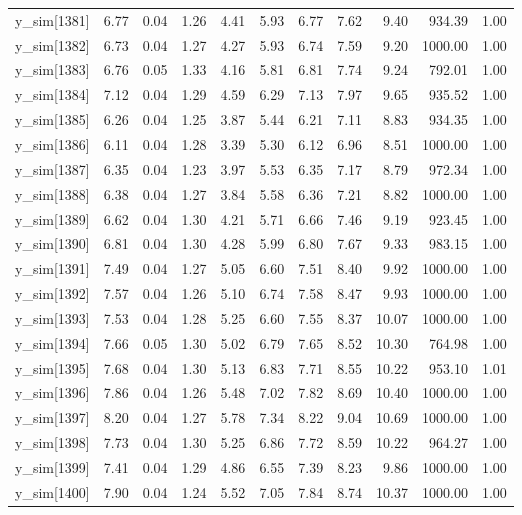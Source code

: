 \begin{table}[ht]
\begin{tabular}{rrrrrrrrrrr}
  y\_sim[1381] & 6.77 & 0.04 & 1.26 & 4.41 & 5.93 & 6.77 & 7.62 & 9.40 & 934.39 & 1.00 \\ 
  y\_sim[1382] & 6.73 & 0.04 & 1.27 & 4.27 & 5.93 & 6.74 & 7.59 & 9.20 & 1000.00 & 1.00 \\ 
  y\_sim[1383] & 6.76 & 0.05 & 1.33 & 4.16 & 5.81 & 6.81 & 7.74 & 9.24 & 792.01 & 1.00 \\ 
  y\_sim[1384] & 7.12 & 0.04 & 1.29 & 4.59 & 6.29 & 7.13 & 7.97 & 9.65 & 935.52 & 1.00 \\ 
  y\_sim[1385] & 6.26 & 0.04 & 1.25 & 3.87 & 5.44 & 6.21 & 7.11 & 8.83 & 934.35 & 1.00 \\ 
  y\_sim[1386] & 6.11 & 0.04 & 1.28 & 3.39 & 5.30 & 6.12 & 6.96 & 8.51 & 1000.00 & 1.00 \\ 
  y\_sim[1387] & 6.35 & 0.04 & 1.23 & 3.97 & 5.53 & 6.35 & 7.17 & 8.79 & 972.34 & 1.00 \\ 
  y\_sim[1388] & 6.38 & 0.04 & 1.27 & 3.84 & 5.58 & 6.36 & 7.21 & 8.82 & 1000.00 & 1.00 \\ 
  y\_sim[1389] & 6.62 & 0.04 & 1.30 & 4.21 & 5.71 & 6.66 & 7.46 & 9.19 & 923.45 & 1.00 \\ 
  y\_sim[1390] & 6.81 & 0.04 & 1.30 & 4.28 & 5.99 & 6.80 & 7.67 & 9.33 & 983.15 & 1.00 \\ 
  y\_sim[1391] & 7.49 & 0.04 & 1.27 & 5.05 & 6.60 & 7.51 & 8.40 & 9.92 & 1000.00 & 1.00 \\ 
  y\_sim[1392] & 7.57 & 0.04 & 1.26 & 5.10 & 6.74 & 7.58 & 8.47 & 9.93 & 1000.00 & 1.00 \\ 
  y\_sim[1393] & 7.53 & 0.04 & 1.28 & 5.25 & 6.60 & 7.55 & 8.37 & 10.07 & 1000.00 & 1.00 \\ 
  y\_sim[1394] & 7.66 & 0.05 & 1.30 & 5.02 & 6.79 & 7.65 & 8.52 & 10.30 & 764.98 & 1.00 \\ 
  y\_sim[1395] & 7.68 & 0.04 & 1.30 & 5.13 & 6.83 & 7.71 & 8.55 & 10.22 & 953.10 & 1.01 \\ 
  y\_sim[1396] & 7.86 & 0.04 & 1.26 & 5.48 & 7.02 & 7.82 & 8.69 & 10.40 & 1000.00 & 1.00 \\ 
  y\_sim[1397] & 8.20 & 0.04 & 1.27 & 5.78 & 7.34 & 8.22 & 9.04 & 10.69 & 1000.00 & 1.00 \\ 
  y\_sim[1398] & 7.73 & 0.04 & 1.30 & 5.25 & 6.86 & 7.72 & 8.59 & 10.22 & 964.27 & 1.00 \\ 
  y\_sim[1399] & 7.41 & 0.04 & 1.29 & 4.86 & 6.55 & 7.39 & 8.23 & 9.86 & 1000.00 & 1.00 \\ 
  y\_sim[1400] & 7.90 & 0.04 & 1.24 & 5.52 & 7.05 & 7.84 & 8.74 & 10.37 & 1000.00 & 1.00 \\ 

\end{tabular}
\end{table}
